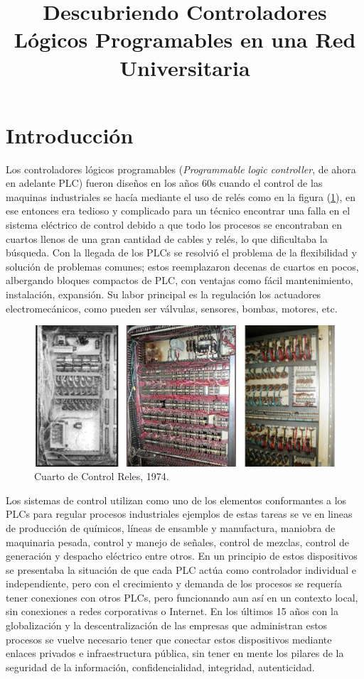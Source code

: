 \documentclass[jou,apacite]{apa6}
\title{Descubriendo Controladores Lógicos Programables en una Red Universitaria}
\begin{document}
\maketitle    
                        
\section{Introducción}
Los controladores lógicos programables (\textit{Programmable logic controller}, de ahora en adelante PLC) fueron diseños en los años 60s \cite{HistPlc}
cuando el control de las maquinas industriales se hacía mediante el uso de relés como en la figura (\ref{fig:cuartoreles}), en ese entonces era tedioso
y complicado para un técnico encontrar una falla en el sistema eléctrico de control debido a que todo los procesos se encontraban en cuartos llenos de  
una gran cantidad de cables y relés, lo que dificultaba la búsqueda. Con la llegada de los  PLCs se resolvió el problema de la flexibilidad y solución 
de problemas comunes; estos reemplazaron decenas de cuartos en pocos, albergando bloques compactos de PLC, con ventajas como fácil mantenimiento,
instalación, expansión. Su labor principal es la regulación  los actuadores electromecánicos, como pueden ser válvulas, sensores, bombas, motores, etc.\\
\begin{figure}[htb]
\centering
\includegraphics[scale=0.28]{images/f1relayroom.png}
\caption{Cuarto de Control Reles, 1974.} \label{fig:cuartoreles}
\end{figure}

Los sistemas de control utilizan como uno de los elementos conformantes  a los PLCs  para regular procesos industriales  ejemplos de estas tareas se ve
en lineas de producción de químicos, líneas de ensamble y manufactura, maniobra de maquinaria pesada,  control y manejo de señales, control de mezclas, 
control de generación y despacho eléctrico entre otros. En un principio de estos dispositivos se presentaba la situación de que 
cada PLC actúa como controlador individual e independiente, pero con el crecimiento y demanda de los procesos se requería tener conexiones con otros 
PLCs, pero funcionando aun así en un contexto local, sin conexiones a redes corporativas o Internet\cite{Proteccion}. 
En los últimos 15 años con la globalización y la descentralización de las empresas que administran estos procesos se vuelve necesario tener que 
conectar estos dispositivos mediante enlaces privados e infraestructura pública, sin tener en mente los pilares de la seguridad de la información, confidencialidad, integridad, autenticidad.\\
\end{document}

